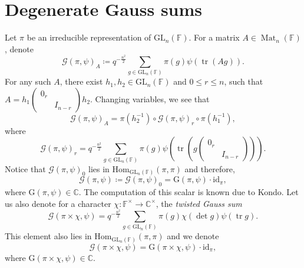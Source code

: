 \documentclass[12pt, reqno]{amsart}
\theoremstyle{definition}
\theoremstyle{definition}
\theoremstyle{definition}
\newcommand{\cComplex}{\mathbb{C}}
\newcommand{\multiplicativegroup}[1]{#1^{\times}}
\newcommand{\Hom}{\mathrm{Hom}}
\newcommand{\idmap}{\mathrm{id}}
\newcommand{\fieldCharacter}{\psi}
\newcommand{\IdentityMatrix}[1]{I_{#1}}
\newcommand{\trace}{\operatorname{tr}}
\newcommand{\GL}{\mathrm{GL}}
\newcommand{\finiteField}{\mathbb{F}}
\newcommand{\squareMatrix}{\operatorname{Mat}}
\newcommand{\GaussSum}[2]{\mathcal{G}\left(#1, #2\right)}
\newcommand{\GaussSumScalar}[2]{\mathrm{G}\left(#1, #2\right)}
\begin{document}
\section{Degenerate Gauss sums}
Let $\pi$ be an irreducible representation of $\GL_n\left(\finiteField\right)$. For a matrix $A \in \squareMatrix_n\left(\finiteField\right)$, denote
$$\GaussSum{\pi}{\fieldCharacter}_A \coloneqq q^{-\frac{n^2}{2}} \sum_{g \in \GL_n\left(\finiteField\right)} \pi\left(g\right) \fieldCharacter\left(\trace\left(A g\right)\right).$$
For any such $A$, there exist $h_1, h_2 \in \GL_n\left(\finiteField\right)$ and $0 \le r \le n$, such that $A = h_1 \begin{pmatrix}
	0_r\\
	& \IdentityMatrix{n-r}
\end{pmatrix} h_2$. Changing variables, we see that $$\GaussSum{\pi}{\fieldCharacter}_A = \pi \left(h_2^{-1}\right) \circ \GaussSum{\pi}{\fieldCharacter}_r \circ \pi\left(h_1^{-1}\right),$$
where
$$\GaussSum{\pi}{\fieldCharacter}_r = q^{-\frac{n^2}{2}} \sum_{g \in \GL_n\left(\finiteField\right)} \pi\left(g\right) \fieldCharacter\left(\trace\left(g \begin{pmatrix}
	0_{r}\\
	& \IdentityMatrix{n-r}
\end{pmatrix}\right)\right).$$
Notice that $\GaussSum{\pi}{\fieldCharacter}_0$ lies in $\Hom_{\GL_n\left(\finiteField\right)}\left(\pi, \pi\right)$ and therefore, $$\GaussSum{\pi}{\fieldCharacter} \coloneqq \GaussSum{\pi}{\fieldCharacter}_0 = \GaussSumScalar{\pi}{\fieldCharacter} \cdot \idmap_\pi,$$
where $\GaussSumScalar{\pi}{\fieldCharacter} \in \cComplex$. The computation of this scalar is known due to Kondo. Let us also denote for a character $\chi \colon \multiplicativegroup{\finiteField} \to \multiplicativegroup{\cComplex}$, the \emph{twisted Gauss sum}
$$\GaussSum{\pi \times \chi}{\fieldCharacter} = q^{-\frac{n^2}{2}} \sum_{g \in \GL_n\left(\finiteField\right)} \pi\left(g\right) \chi\left(\det g\right) \fieldCharacter\left(\trace g\right).$$
This element also lies in $\Hom_{\GL_n\left(\finiteField\right)}\left(\pi, \pi\right)$ and we denote
$$\GaussSum{\pi \times \chi}{\fieldCharacter} = \GaussSumScalar{\pi \times \chi}{\fieldCharacter} \cdot \idmap_\pi,$$
where $\GaussSumScalar{\pi \times \chi}{\fieldCharacter} \in \cComplex$.
\end{document}

